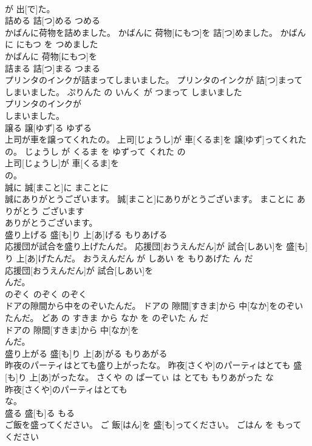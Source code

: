 \documentclass[8pt]{extreport}
\begin{document}
\begin{CJK}{UTF8}{min}
\\	が 出[で]た。			
\\	詰める	詰[つ]める	つめる	
\\	かばんに荷物を詰めました。	かばんに 荷物[にもつ]を 詰[つ]めました。	かばん に にもつ を つめました	
\\	かばんに 荷物[にもつ]を
\\	詰まる	詰[つ]まる	つまる	
\\	プリンタのインクが詰まってしまいました。	プリンタのインクが 詰[つ]まってしまいました。	ぷりんた の いんく が つまって しまいました	
\\	プリンタのインクが
\\	しまいました。			
\\	譲る	譲[ゆず]る	ゆずる	
\\	上司が車を譲ってくれたの。	上司[じょうし]が 車[くるま]を 譲[ゆず]ってくれたの。	じょうし が くるま を ゆずって くれた の	
\\	上司[じょうし]が 車[くるま]を
\\	の。			
\\	誠に	誠[まこと]に	まことに	
\\	誠にありがとうございます。	誠[まこと]にありがとうございます。	まことに ありがとう ございます	
\\	ありがとうございます。			
\\	盛り上げる	盛[も]り 上[あ]げる	もりあげる	
\\	応援団が試合を盛り上げたんだ。	応援団[おうえんだん]が 試合[しあい]を 盛[も]り 上[あ]げたんだ。	おうえんだん が しあい を もりあげた ん だ	
\\	応援団[おうえんだん]が 試合[しあい]を
\\	んだ。			
\\	のぞく	のぞく	のぞく	
\\	ドアの隙間から中をのぞいたんだ。	ドアの 隙間[すきま]から 中[なか]をのぞいたんだ。	どあ の すきま から なか を のぞいた ん だ	
\\	ドアの 隙間[すきま]から 中[なか]を
\\	んだ。			
\\	盛り上がる	盛[も]り 上[あ]がる	もりあがる	
\\	昨夜のパーティはとても盛り上がったな。	昨夜[さくや]のパーティはとても 盛[も]り 上[あ]がったな。	さくや の ぱーてぃ は とても もりあがった な	
\\	昨夜[さくや]のパーティはとても
\\	な。			
\\	盛る	盛[も]る	もる	
\\	ご飯を盛ってください。	ご 飯[はん]を 盛[も]ってください。	ごはん を もって ください	

\end{CJK}
\end{document}
